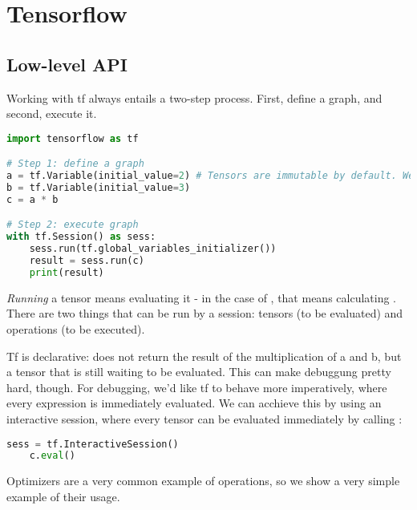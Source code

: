 \section{Tensorflow}

\subsection{Low-level API}

Working with tf always entails a two-step process. First, define a graph, and second, execute it. 

\begin{lstlisting}[language=python]
import tensorflow as tf

# Step 1: define a graph
a = tf.Variable(initial_value=2) # Tensors are immutable by default. We must wrap them in a Variable to allow them to change
b = tf.Variable(initial_value=3)
c = a * b

# Step 2: execute graph
with tf.Session() as sess:
    sess.run(tf.global_variables_initializer())
    result = sess.run(c)
    print(result)

\end{lstlisting}

\emph{Running} a tensor means evaluating it - in the case of , that means calculating .
There are two things that can be run by a session: tensors (to be evaluated) and operations (to be executed). 

Tf is declarative:  does not return the result of the multiplication of a and b, but a tensor that is still waiting to be evaluated. 
This can make debuggung pretty hard, though. For debugging, we'd like tf to behave more imperatively, where every expression is immediately evaluated. 
We can acchieve this by using an interactive session, where every tensor can be evaluated immediately by calling :
\begin{lstlisting}[language=python]
    sess = tf.InteractiveSession()
    c.eval()
\end{lstlisting}

Optimizers are a very common example of operations, so we show a very simple example of their usage.

